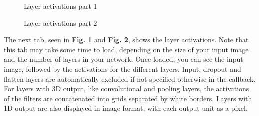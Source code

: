 
\begin{figure}[h!]
    \centering
        \caption{Layer activations part 1}
        \label{layeract-tab1}
\end{figure}

\begin{figure}[h!]
    \centering
        \caption{Layer activations part 2}
        \label{layeract-tab2}
\end{figure}

\noindent The next tab, seen in \textbf{Fig. \ref{layeract-tab1}} and \textbf{Fig. \ref{layeract-tab2}}, shows the layer activations. Note that this tab may take some time to load, depending on the size of your input image and the number of layers in your network. Once loaded, you can see the input image, followed by the activations for the different layers. Input, dropout and flatten layers are automatically excluded if not specified otherwise in the callback. For layers with 3D output, like convolutional and pooling layers, the activations of the filters are concatenated into grids separated by white borders. Layers with 1D output are also displayed in image format, with each output unit as a pixel. \\

